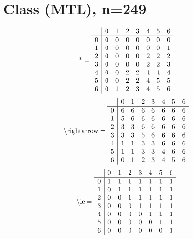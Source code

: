 \documentclass[11pt]{article}
\begin{document}
\section{Class (MTL), n=249}
\[\text{*} = 
\begin{array}{r | r r r r r r r}
 & 0 & 1 & 2 & 3 & 4 & 5 & 6 \\ \hline
0 & 0 & 0 & 0 & 0 & 0 & 0 & 0 \\
1 & 0 & 0 & 0 & 0 & 0 & 0 & 1 \\
2 & 0 & 0 & 0 & 0 & 2 & 2 & 2 \\
3 & 0 & 0 & 0 & 0 & 2 & 2 & 3 \\
4 & 0 & 0 & 2 & 2 & 4 & 4 & 4 \\
5 & 0 & 0 & 2 & 2 & 4 & 5 & 5 \\
6 & 0 & 1 & 2 & 3 & 4 & 5 & 6 \\
\end{array}
\]
\[\text{\textbackslash rightarrow} = 
\begin{array}{r | r r r r r r r}
 & 0 & 1 & 2 & 3 & 4 & 5 & 6 \\ \hline
0 & 6 & 6 & 6 & 6 & 6 & 6 & 6 \\
1 & 5 & 6 & 6 & 6 & 6 & 6 & 6 \\
2 & 3 & 3 & 6 & 6 & 6 & 6 & 6 \\
3 & 3 & 3 & 5 & 6 & 6 & 6 & 6 \\
4 & 1 & 1 & 3 & 3 & 6 & 6 & 6 \\
5 & 1 & 1 & 3 & 3 & 4 & 6 & 6 \\
6 & 0 & 1 & 2 & 3 & 4 & 5 & 6 \\
\end{array}
\]
\[\text{\textbackslash le} = 
\begin{array}{r | r r r r r r r}
 & 0 & 1 & 2 & 3 & 4 & 5 & 6 \\ \hline
0 & 1 & 1 & 1 & 1 & 1 & 1 & 1 \\
1 & 0 & 1 & 1 & 1 & 1 & 1 & 1 \\
2 & 0 & 0 & 1 & 1 & 1 & 1 & 1 \\
3 & 0 & 0 & 0 & 1 & 1 & 1 & 1 \\
4 & 0 & 0 & 0 & 0 & 1 & 1 & 1 \\
5 & 0 & 0 & 0 & 0 & 0 & 1 & 1 \\
6 & 0 & 0 & 0 & 0 & 0 & 0 & 1 \\
\end{array}
\]
\end{document}
